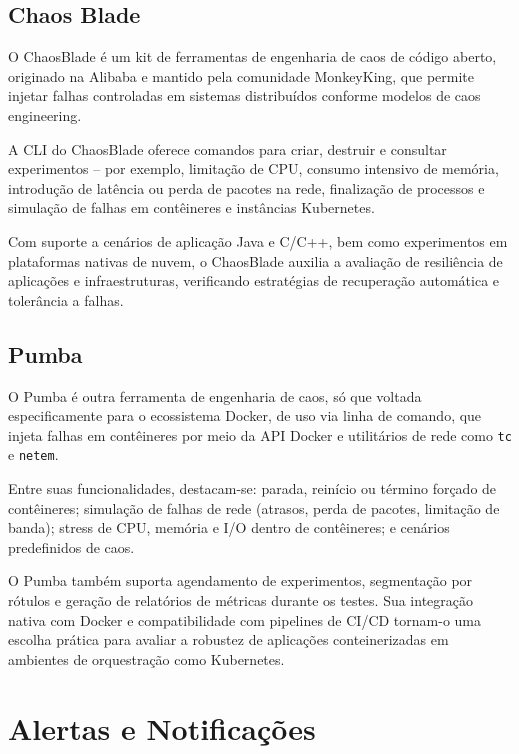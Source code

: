 \subsection{Chaos Blade}
\label{subsection:ChaosBlade}

O ChaosBlade \citep{chaosblade2025} é um kit de ferramentas de engenharia de caos de código aberto, originado na Alibaba e mantido pela comunidade MonkeyKing, que permite injetar falhas controladas em sistemas distribuídos conforme modelos de caos engineering.

A CLI do ChaosBlade oferece comandos para criar, destruir e consultar experimentos -- por exemplo, limitação de CPU, consumo intensivo de memória, introdução de latência ou perda de pacotes na rede, finalização de processos e simulação de falhas em contêineres e instâncias Kubernetes.

Com suporte a cenários de aplicação Java e C/C++, bem como experimentos em plataformas nativas de nuvem, o ChaosBlade auxilia a avaliação de resiliência de aplicações e infraestruturas, verificando estratégias de recuperação automática e tolerância a falhas.
    
\subsection{Pumba}
\label{subsection:Pumba}

O Pumba \citep{pumba2025} é outra ferramenta de engenharia de caos, só que voltada especificamente para o ecossistema Docker, de uso via linha de comando, que injeta falhas em contêineres por meio da API Docker e utilitários de rede como \verb|tc| e \verb|netem|.

Entre suas funcionalidades, destacam-se: parada, reinício ou término forçado de contêineres; simulação de falhas de rede (atrasos, perda de pacotes, limitação de banda); stress de CPU, memória e I/O dentro de contêineres; e cenários predefinidos de caos.

O Pumba também suporta agendamento de experimentos, segmentação por rótulos e geração de relatórios de métricas durante os testes. Sua integração nativa com Docker e compatibilidade com pipelines de CI/CD tornam-o uma escolha prática para avaliar a robustez de aplicações conteinerizadas em ambientes de orquestração como Kubernetes.

\section{Alertas e Notificações}
\label{section:AlertasNotificacoes}

